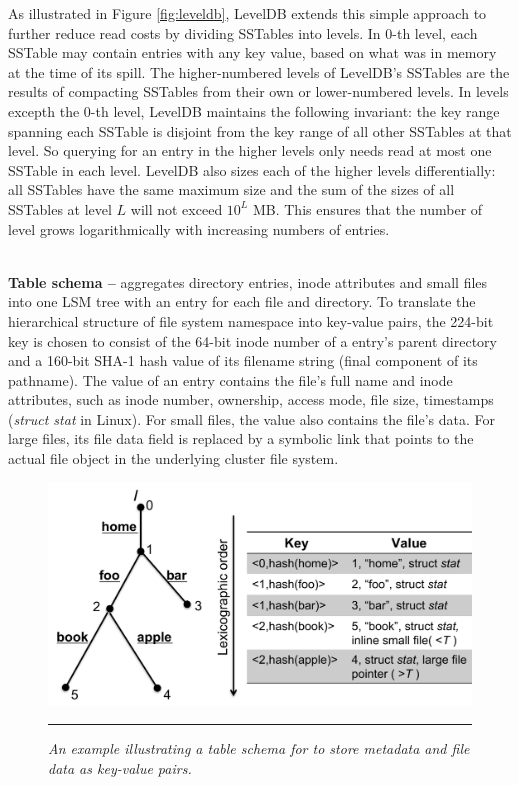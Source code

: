 As illustrated in Figure \ref{fig:leveldb},
LevelDB extends this simple approach to further
reduce read costs by dividing SSTables into levels.
In 0-th level, each SSTable may contain entries with any key value,
based on what was in memory at the time of its spill.
The higher-numbered levels of LevelDB's SSTables are
the results of compacting SSTables from their own or lower-numbered levels.
In levels excepth the 0-th level, LevelDB maintains the following invariant:
the key range spanning each SSTable is disjoint from
the key range of all other SSTables at that level.
So querying for an entry in the higher levels
only needs read at most one SSTable in each level.
LevelDB also sizes each of the higher levels differentially:
all SSTables have the same maximum size and
the sum of the sizes of all SSTables at level $L$ will not exceed $10^L$ MB.
This ensures that the number of level grows
logarithmically with increasing numbers of entries.

~\\
\textbf{Table schema -- }
\tfs aggregates directory entries,
inode attributes and small files into one LSM tree
with an entry for each file and directory.
To translate the hierarchical structure of file system namespace
into key-value pairs, the 224-bit key is chosen to consist of
the 64-bit inode number of a entry's parent directory
and a 160-bit SHA-1 hash value of its filename string
(final component of its pathname).
The value of an entry contains the file's full name and inode attributes,
such as inode number, ownership, access mode, file size, timestamps (\textit{struct stat} in Linux).
For small files, the value also contains the file's data.
For large files, its file data field is replaced by a symbolic link
that points to the actual file object in the underlying cluster file system.

\begin{figure}[t]
\centering
\includegraphics[scale=0.4]{figs/schema}
\vspace{10pt}
\caption{\textit{
An example illustrating a table schema for \tfs
to store metadata and file data as key-value pairs.}}
\vspace{10pt}
\hrule
\label{fig:schema}
\end{figure}

